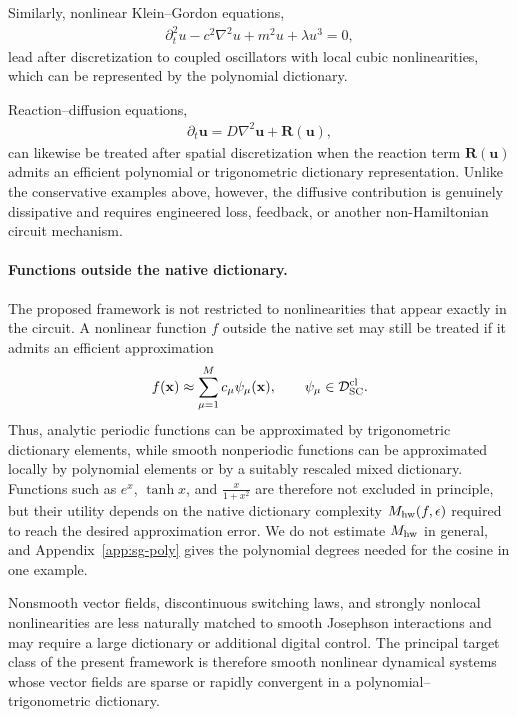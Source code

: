 \documentclass[pra,twocolumn,superscriptaddress,nofootinbib,floatfix]{revtex4-2}
\theoremstyle{remark}
\begin{document}
Similarly, nonlinear Klein--Gordon equations,
\begin{align}
\partial_t^2u-c^2\nabla^2u+m^2u+\lambda u^3=0,
\label{eq:nonlinear-klein-gordon}
\end{align}
lead after discretization to coupled oscillators with local cubic nonlinearities, which can be represented by the polynomial dictionary.

Reaction--diffusion equations,
\begin{align}
\partial_t \mathbf u=D\nabla^2\mathbf u+\mathbf R(\mathbf u),
\label{eq:reaction-diffusion}
\end{align}
can likewise be treated after spatial discretization when the reaction term \(\mathbf R(\mathbf u)\) admits an efficient polynomial or trigonometric dictionary representation. Unlike the conservative examples above, however, the diffusive contribution is genuinely dissipative and requires engineered loss, feedback, or another non-Hamiltonian circuit mechanism.

\paragraph{Functions outside the native dictionary.}
The proposed framework is not restricted to nonlinearities that appear exactly in the circuit. A nonlinear function \(f\) outside the native set may still be treated if it admits an efficient approximation
\begin{align}
f(\mathbf x)\approx\sum_{\mu=1}^{M}c_{\mu}\psi_{\mu}(\mathbf x),\qquad\psi_\mu\in\mathcal D_{\rm SC}^{\rm cl}.
\end{align}
Thus, analytic periodic functions can be approximated by trigonometric dictionary elements, while smooth nonperiodic functions can be approximated locally by polynomial elements or by a suitably rescaled mixed dictionary. Functions such as \(e^x\), \(\tanh x\), and \(\frac{x}{1+x^2}\) are therefore not excluded in principle, but their utility depends on the native dictionary complexity \(M_{\rm hw}(f,\epsilon)\) required to reach the desired approximation error. We do not estimate \(M_{\rm hw}\) in general, and Appendix~\ref{app:sg-poly} gives the polynomial degrees needed for the cosine in one example.

Nonsmooth vector fields, discontinuous switching laws, and strongly nonlocal nonlinearities are less naturally matched to smooth Josephson interactions and may require a large dictionary or additional digital control. The principal target class of the present framework is therefore smooth nonlinear dynamical systems whose vector fields are sparse or rapidly convergent in a polynomial--trigonometric dictionary.
\end{document}
